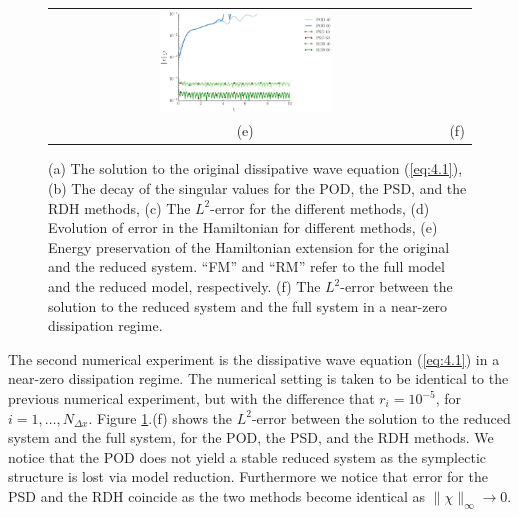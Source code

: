 \begin{figure}[t]
\begin{tabular}{cc}
\includegraphics[width=0.45\textwidth]{./figs/wave/error_homo} \\
(e) & (f) 
\end{tabular}
\caption{(a) The solution to the original dissipative wave equation (\ref{eq:4.1}), (b) The decay of the singular values for the POD, the PSD, and the RDH methods, (c) The $L^2$-error for the different methods, (d) Evolution of error in the Hamiltonian for different methods, (e) Energy preservation of the Hamiltonian extension for the original and the reduced system. ``FM'' and ``RM'' refer to the full model and the reduced model, respectively. (f) The $L^2$-error between the solution to the reduced system and the full system in a near-zero dissipation regime.} \label{fig:4.1}
\end{figure}

The second numerical experiment is the dissipative wave equation (\ref{eq:4.1}) in a near-zero dissipation regime. The numerical setting is taken to be identical to the previous numerical experiment, but with the difference that $r_i = 10^{-5}$, for $i=1,\dots,N_{\Delta x}$. Figure \ref{fig:4.1}.(f) shows the $L^2$-error between the solution to the reduced system and the full system, for the POD, the PSD, and the RDH methods. We notice that the POD does not yield a stable reduced system as the symplectic structure is lost via model reduction. Furthermore we notice that error for the PSD and the RDH coincide as the two methods become identical as $\| \chi \|_{\infty}\to 0$.


